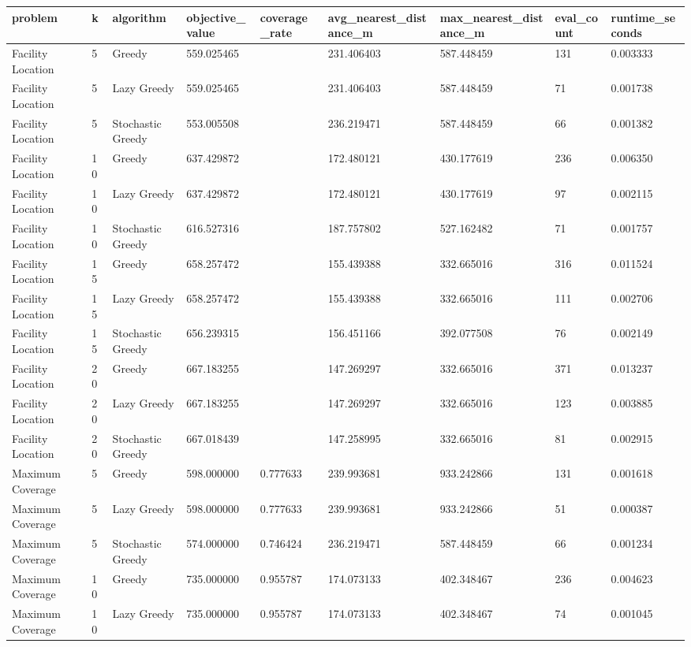 \begin{tabular}{lllllllll}
\hline
problem & k & algorithm & objective_value & coverage_rate & avg_nearest_distance_m & max_nearest_distance_m & eval_count & runtime_seconds \\
\hline
Facility Location & 5 & Greedy & 559.025465 &  & 231.406403 & 587.448459 & 131 & 0.003333 \\
Facility Location & 5 & Lazy Greedy & 559.025465 &  & 231.406403 & 587.448459 & 71 & 0.001738 \\
Facility Location & 5 & Stochastic Greedy & 553.005508 &  & 236.219471 & 587.448459 & 66 & 0.001382 \\
Facility Location & 10 & Greedy & 637.429872 &  & 172.480121 & 430.177619 & 236 & 0.006350 \\
Facility Location & 10 & Lazy Greedy & 637.429872 &  & 172.480121 & 430.177619 & 97 & 0.002115 \\
Facility Location & 10 & Stochastic Greedy & 616.527316 &  & 187.757802 & 527.162482 & 71 & 0.001757 \\
Facility Location & 15 & Greedy & 658.257472 &  & 155.439388 & 332.665016 & 316 & 0.011524 \\
Facility Location & 15 & Lazy Greedy & 658.257472 &  & 155.439388 & 332.665016 & 111 & 0.002706 \\
Facility Location & 15 & Stochastic Greedy & 656.239315 &  & 156.451166 & 392.077508 & 76 & 0.002149 \\
Facility Location & 20 & Greedy & 667.183255 &  & 147.269297 & 332.665016 & 371 & 0.013237 \\
Facility Location & 20 & Lazy Greedy & 667.183255 &  & 147.269297 & 332.665016 & 123 & 0.003885 \\
Facility Location & 20 & Stochastic Greedy & 667.018439 &  & 147.258995 & 332.665016 & 81 & 0.002915 \\
Maximum Coverage & 5 & Greedy & 598.000000 & 0.777633 & 239.993681 & 933.242866 & 131 & 0.001618 \\
Maximum Coverage & 5 & Lazy Greedy & 598.000000 & 0.777633 & 239.993681 & 933.242866 & 51 & 0.000387 \\
Maximum Coverage & 5 & Stochastic Greedy & 574.000000 & 0.746424 & 236.219471 & 587.448459 & 66 & 0.001234 \\
Maximum Coverage & 10 & Greedy & 735.000000 & 0.955787 & 174.073133 & 402.348467 & 236 & 0.004623 \\
Maximum Coverage & 10 & Lazy Greedy & 735.000000 & 0.955787 & 174.073133 & 402.348467 & 74 & 0.001045 \\

\end{tabular}
